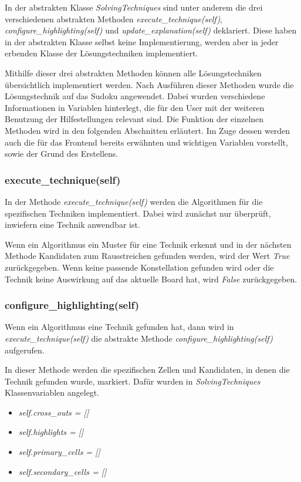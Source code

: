 In der abstrakten Klasse \textit{SolvingTechniques} sind unter anderem die drei verschiedenen abstrakten Methoden \textit{execute\_technique(self)}, \textit{configure\_highlighting(self)} und \textit{update\_explanation(self)} deklariert. Diese haben in der abstrakten Klasse selbst keine Implementierung, werden aber in jeder erbenden Klasse der Lösungstechniken implementiert.

Mithilfe dieser drei abstrakten Methoden können alle Lösungstechniken übersichtlich implementiert werden. Nach Ausführen dieser Methoden wurde die Lösungstechnik auf das Sudoku angewendet. Dabei  wurden verschiedene Informationen in Variablen hinterlegt, die für den User mit der weiteren Benutzung der Hilfestellungen relevant sind.
Die Funktion der einzelnen Methoden wird in den folgenden Abschnitten erläutert. Im Zuge dessen werden auch die für das Frontend bereits erwähnten und wichtigen Variablen vorstellt, sowie der Grund des Erstellens.

\newpage

\subsubsection{execute\_technique(self)}
In der Methode \textit{execute\_technique(self)} werden die Algorithmen für die spezifischen Techniken implementiert. Dabei wird zunächst nur überprüft, inwiefern eine Technik anwendbar ist. 

Wenn ein Algorithmus ein Muster für eine Technik erkennt und in der nächsten Methode Kandidaten zum Rausstreichen gefunden werden, wird der Wert \textit{True} zurückgegeben. Wenn keine passende Konstellation gefunden wird oder die Technik keine Auswirkung auf das aktuelle Board hat, wird \textit{False} zurückgegeben.

\subsubsection{configure\_highlighting(self)}
Wenn ein Algorithmus eine Technik gefunden hat, dann wird in \textit{execute\_technique(self)} die abstrakte Methode 
\textit{configure\_highlighting(self)} aufgerufen. 

In dieser Methode werden die spezifischen Zellen und Kandidaten, in denen die Technik gefunden wurde, markiert. Dafür wurden in \textit{SolvingTechniques} Klassenvariablen angelegt. 
\begin{itemize}
	\item \textit{self.cross\_outs = []}
	\item \textit{self.highlights = []}
	\item \textit{self.primary\_cells = []}
	\item \textit{self.secondary\_cells = []}
\end{itemize}

